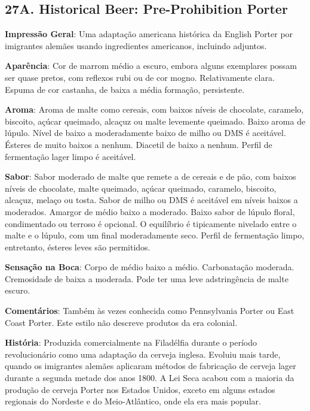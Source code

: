 \subsection*{27A. Historical Beer: Pre-Prohibition Porter}

\textbf{Impressão Geral}: Uma adaptação americana histórica da English Porter por imigrantes alemães usando ingredientes americanos, incluindo adjuntos.

\textbf{Aparência}: Cor de marrom médio a escuro, embora alguns exemplares possam ser quase pretos, com reflexos rubi ou de cor mogno. Relativamente clara. Espuma de cor castanha, de baixa a média formação, persistente.

\textbf{Aroma}: Aroma de malte como cereais, com baixos níveis de chocolate, caramelo, biscoito, açúcar queimado, alcaçuz ou malte levemente queimado. Baixo aroma de lúpulo. Nível de baixo a moderadamente baixo de milho ou DMS é aceitável. Ésteres de muito baixos a nenhum. Diacetil de baixo a nenhum. Perfil de fermentação lager limpo é aceitável.

\textbf{Sabor}: Sabor moderado de malte que remete a de cereais e de pão, com baixos níveis de chocolate, malte queimado, açúcar queimado, caramelo, biscoito, alcaçuz, melaço ou tosta. Sabor de milho ou DMS é aceitável em níveis baixos a moderados. Amargor de médio baixo a moderado. Baixo sabor de lúpulo floral, condimentado ou terroso é opcional. O equilíbrio é tipicamente nivelado entre o malte e o lúpulo, com um final moderadamente seco. Perfil de fermentação limpo, entretanto, ésteres leves são permitidos.

\textbf{Sensação na Boca}: Corpo de médio baixo a médio. Carbonatação moderada. Cremosidade de baixa a moderada. Pode ter uma leve adstringência de malte escuro.

\textbf{Comentários}: Também às vezes conhecida como Pennsylvania Porter ou East Coast Porter. Este estilo não descreve produtos da era colonial.

\textbf{História}: Produzida comercialmente na Filadélfia durante o período revolucionário como uma adaptação da cerveja inglesa. Evoluiu mais tarde, quando os imigrantes alemães aplicaram métodos de fabricação de cerveja lager durante a segunda metade dos anos 1800. A Lei Seca acabou com a maioria da produção de cerveja Porter nos Estados Unidos, exceto em alguns estados regionais do Nordeste e do Meio-Atlântico, onde ela era mais popular.

